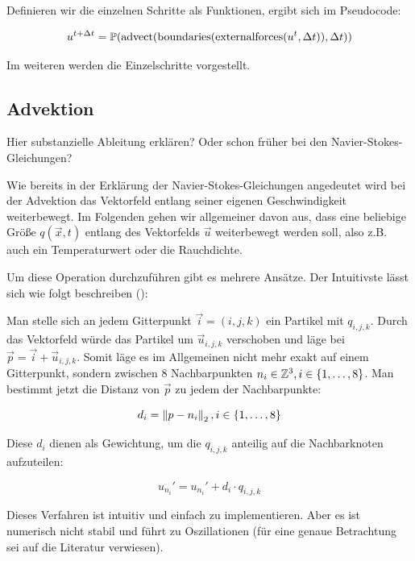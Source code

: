 Definieren wir die einzelnen Schritte als Funktionen, ergibt sich im Pseudocode:

\begin{equation}
u^{t+\Delta t}
=
\PimiddyProjection(
	\PimiddyFormelText{advect}(
		\PimiddyFormelText{boundaries}(
			\PimiddyFormelText{externalforces}(
				u^t,
				\Delta t)),
		\Delta t))
\end{equation}

Im weiteren werden die Einzelschritte vorgestellt.

\subsection{Advektion}

Hier substanzielle Ableitung erklären? Oder schon früher bei den
Navier-Stokes-Gleichungen?

Wie bereits in der Erklärung der Navier-Stokes-Gleichungen angedeutet wird bei
der Advektion das Vektorfeld entlang seiner eigenen Geschwindigkeit
weiterbewegt. Im Folgenden gehen wir allgemeiner davon aus, dass eine beliebige
Größe $q(\vec{x},t)$ entlang des Vektorfelds $\vec{u}$ weiterbewegt werden soll,
also z.B. auch ein Temperaturwert oder die Rauchdichte.

Um diese Operation durchzuführen gibt es mehrere Ansätze. Der Intuitivste lässt
sich wie folgt beschreiben (\cite{Stam2003}):

Man stelle sich an jedem Gitterpunkt $\vec{i}=(i,j,k)$ ein Partikel mit
 $q_{i,j,k}$. Durch das Vektorfeld würde das Partikel
um $\vec{u}_{i,j,k}$ verschoben und läge bei $\vec{p}=\vec{i}+\vec{u}_{i,j,k}$.
Somit läge es im Allgemeinen nicht mehr exakt auf einem Gitterpunkt, sondern
zwischen 8 Nachbarpunkten $n_i \in \PimiddyGanz^3, i \in \{1,\ldots,8\}$. Man bestimmt jetzt die
Distanz von $\vec{p}$ zu jedem der Nachbarpunkte:

\begin{equation}
d_i = \PimiddyNorm{2}{p - n_i}, i \in \{1,\ldots,8\}
\end{equation}

Diese $d_i$ dienen als Gewichtung, um die  $q_{i,j,k}$
anteilig auf die Nachbarknoten aufzuteilen:

\begin{equation}
u_{n_i}' = u_{n_i}' + d_i \cdot q_{i,j,k}
\end{equation}

Dieses Verfahren ist intuitiv und einfach zu implementieren. Aber es ist
numerisch nicht stabil und führt zu Oszillationen (für eine genaue Betrachtung
sei auf die Literatur verwiesen).

